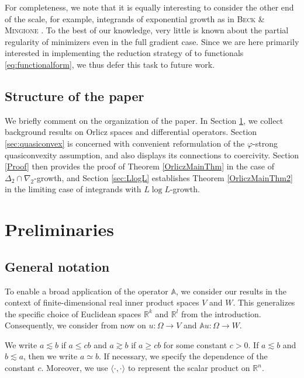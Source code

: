 \documentclass[a4paper,11pt]{amsart}
\numberwithin{equation}{section}
\begin{document}
	For completeness, we note that it is equally interesting to consider the other end of the scale, for example, integrands of exponential growth as in \textsc{Beck \& Mingione} \cite{beck_lipschitz_2020}. To the best of our knowledge, very little is known about the partial regularity of minimizers even in the full gradient case. Since we are here primarily interested in implementing the reduction strategy of \cite{contiFXG} to functionals \eqref{eq:functionalform}, we thus defer this task to future work. 
	\subsection*{Structure of the paper} We briefly comment on the organization of the paper. In Section \ref{sec:prelims}, we collect background results on Orlicz spaces and differential operators. Section \ref{sec:quasiconvex} is concerned with convenient reformulation of the $\varphi$-strong quasiconvexity assumption, and also displays its connections to coercivity. Section \ref{Proof} then provides the proof of Theorem \ref{OrliczMainThm} in the case of $\Delta_{2}\cap\nabla_{2}$-growth, and Section \ref{sec:LlogL} establishes Theorem \ref{OrliczMainThm2} in the limiting case of integrands with $L\log L$-growth. 
	\section{Preliminaries}\label{sec:prelims}
	\subsection{General notation}
	
	{To enable a broad application of the operator $\mathbb{A}$, we consider our results in the context of finite-dimensional real inner product spaces $V$ and $W$. This generalizes the specific choice of Euclidean spaces $\mathbb{R}^k$ and $\mathbb{R}^l$ from the introduction. Consequently, we consider from now on $u \colon \Omega \to V$ and $\mathbb{A}u \colon  \Omega \to W$. }
	
	We write $ a \lesssim b $ if $ a \leq c b $ and $ a \gtrsim b $ if $ a \geq c b $  for some constant $c > 0 $. If $a \lesssim b$ and $b \lesssim a$, then we write $a \simeq b$. If  necessary, we specify the dependence of the constant $c$. Moreover, we use $\langle \cdot, \cdot \rangle$ to represent the scalar product on $\mathbb{R}^n$.
\end{document}

